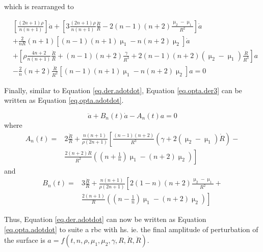 \noindent which is rearranged to

\begin{equation} \label{eq.opta.der3}
\begin{split}
&\left[ \frac{(2n+1)\rho}{n(n+1)}\right]  \ddot{a} + \left[3 \frac{(2n+1)\rho}{n(n+1)}  \frac{\dot{R}}{R} - 2(n-1)(n+2) \frac{\upmu_2 - \upmu_1}{R^2} \right]\dot{a}   \\& + \frac{2}{nR}(n+1)\left[ (n-1)(n+1)\upmu_1 - n(n+2)\upmu_2 \right]\dot{a} \\ & +\left[ \rho  \frac{4n+2}{n(n+1)} \frac{\ddot{R}}{R} + (n-1)(n+2)\frac{\gamma}{R^3} + 2(n-1)(n+2)(\upmu_2 -\upmu_1)\frac{\dot{R}}{R^3}  \right] a \\& - \frac{2}{n} (n+2)\frac{\dot{R}}{R^2} \left[ (n-1)(n+1)\upmu_1 - n(n+2)\upmu_2 \right]a   = 0 
\end{split}
\end{equation}

\noindent Finally, similar to Equation \ref{eq.der.adotdot}, Equation \ref{eq.opta.der3} can be written as  Equation \ref{eq.opta.adotdot}.

\begin{equation}\label{eq.opta.adotdot}
\ddot{a} + B_n(t) \dot{a} - A_n(t) a = 0 
\end{equation}
\noindent where
\begin{equation}\label{eq.opta.An}
\begin{split}
A_n(t) = & 2 \frac{\ddot{R}}{R} + \frac{n(n+1)}{\rho (2n+1)} \left[ \frac{(n-1)(n+2)}{R^3}\left(\gamma + 2(\upmu_2 -\upmu_1)\dot{R} \right)  - \right. \\ & \left. \frac{2(n+2)\dot{R}}{R^2} \left( \left(n+\frac{1}{n}\right)\upmu_1 - (n+2)\upmu_2 \right) \right]
\end{split}
\end{equation}
\noindent and
\begin{equation}\label{eq.opta.Bn}
\begin{split}
B_n(t) = & 3 \frac{\dot{R}}{R} + \frac{n(n+1)}{\rho (2n+1)} \left[ 2(1-n)(n+2) \frac{\upmu_2 - \upmu_1}{R^2} + \right. \\ & \left. \frac{2(n+1)}{R}\left(\left(n-\frac{1}{n}\right)\upmu_1 - (n+2)\upmu_2 \right) \right]
\end{split}
\end{equation}


\noindent Thus, Equation \ref{eq.der.adotdot} can now be written as Equation \ref{eq.opta.adotdot} to suite a \ac{rbc} with \ac{hs}. ie. the final amplitude of perturbation of the surface is $a = f(t, n, \rho, \mu_1, \mu_2, \gamma, R, \dot{R}, \ddot{R})$.


